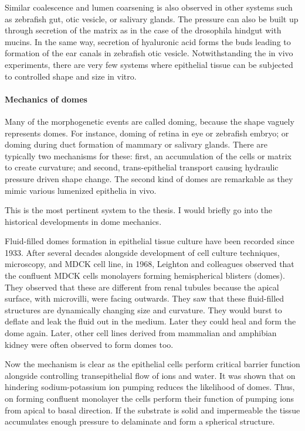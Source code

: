 \documentclass[
]{article}
\begin{document}
Similar coalescence and lumen coarsening is also observed in other
systems such as zebrafish gut, otic vesicle, or salivary glands. The
pressure can also be built up through secretion of the matrix as in the
case of the drosophila hindgut with mucins. In the same way, secretion
of hyaluronic acid forms the buds leading to formation of the ear canals
in zebrafish otic vesicle. Notwithstanding the in vivo experiments,
there are very few systems where epithelial tissue can be subjected to
controlled shape and size in vitro.

\hypertarget{mechanics-of-domes}{%
\paragraph{Mechanics of domes}\label{mechanics-of-domes}}

Many of the morphogenetic events are called doming, because the shape
vaguely represents domes. For instance, doming of retina in eye or
zebrafish embryo; or doming during duct formation of mammary or salivary
glands. There are typically two mechanisms for these: first, an
accumulation of the cells or matrix to create curvature; and second,
trans-epithelial transport causing hydraulic pressure driven shape
change. The second kind of domes are remarkable as they mimic various
lumenized epithelia in vivo.

This is the most pertinent system to the thesis. I would briefly go into
the historical developments in dome mechanics.

Fluid-filled domes formation in epithelial tissue culture have been
recorded since 1933. After several decades alongside development of cell
culture techniques, microscopy, and MDCK cell line, in 1968, Leighton
and colleagues observed that the confluent MDCK cells monolayers forming
hemispherical blisters (domes). They observed that these are different
from renal tubules because the apical surface, with microvilli, were
facing outwards. They saw that these fluid-filled structures are
dynamically changing size and curvature. They would burst to deflate and
leak the fluid out in the medium. Later they could heal and form the
dome again. Later, other cell lines derived from mammalian and amphibian
kidney were often observed to form domes too.

Now the mechanism is clear as the epithelial cells perform critical
barrier function alongside controlling transepithelial flow of ions and
water. It was shown that on hindering sodium-potassium ion pumping
reduces the likelihood of domes. Thus, on forming confluent monolayer
the cells perform their function of pumping ions from apical to basal
direction. If the substrate is solid and impermeable the tissue
accumulates enough pressure to delaminate and form a spherical
structure.
\end{document}
